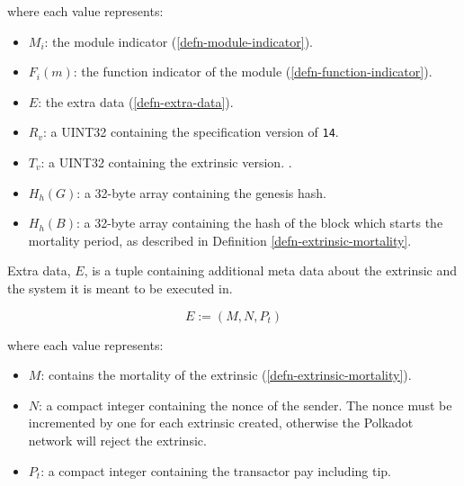 \begin{definition}
    where each value represents:
    \begin{itemize}
        \item $M_i$: the module indicator (\ref{defn-module-indicator}).
        \item $F_i(m)$: the function indicator of the module
        (\ref{defn-function-indicator}).
        \item $E$: the extra data (\ref{defn-extra-data}).
        \item $R_v$: a UINT32 containing the specification version of \verb|14|.
        \item $T_v$: a UINT32 containing the extrinsic version.
        .
        \item $H_h(G)$: a 32-byte array containing the genesis hash.
        \item $H_h(B)$: a 32-byte array containing the hash of the block which
        starts the mortality period, as described in Definition
        \ref{defn-extrinsic-mortality}.
    \end{itemize}
\end{definition}

\begin{definition}
    \label{defn-extra-data}
    Extra data, $E$, is a tuple containing additional meta data about the
    extrinsic and the system it is meant to be executed in.

    \[
        E := (M, N, P_t)
    \]

    where each value represents:
    \begin{itemize}
        \item $M$: contains the mortality of the extrinsic (\ref{defn-extrinsic-mortality}).
        \item $N$: a compact integer containing the nonce of the sender. The
        nonce must be incremented by one for each extrinsic created, otherwise
        the Polkadot network will reject the extrinsic.
        \item $P_t$: a compact integer containing the transactor pay including tip.
    \end{itemize}

\end{definition}

